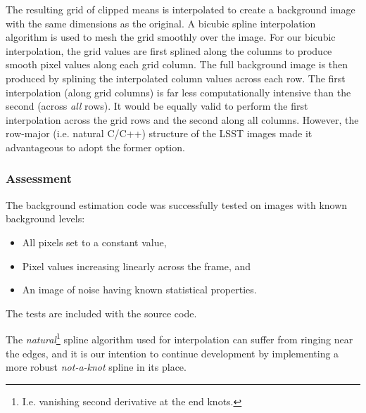 
The resulting grid of clipped means is interpolated to create a
background image with the same dimensions as the original.  A bicubic
spline interpolation algorithm is used to mesh the grid smoothly over
the image.  For our bicubic interpolation, the
grid values are first splined along the columns to produce smooth
pixel values along each grid column.  The full background image is
then produced by splining the interpolated column values across each
row.  The first interpolation (along grid columns) is far less
computationally intensive than the second (across {\it all}
rows).  It would be equally valid to perform the first interpolation
across the grid rows and the second along all columns.  However, the
row-major (i.e. natural C/C++) structure of the LSST images made it
advantageous to adopt the former option.

\subsubsection{Assessment}

The background estimation code was successfully tested on images with
known background levels: 
\begin{itemize}
\item All pixels set to a constant value, 
\item Pixel values increasing linearly across the frame, and 
\item An image of noise having known statistical properties.  
\end{itemize}

The tests are included with the source code.


The {\it natural}\footnote{I.e. vanishing second derivative at the end
knots.} spline algorithm used for interpolation can suffer from
ringing near the edges, and it is our intention to continue
development by implementing a more robust {\it not-a-knot} spline in
its place.
